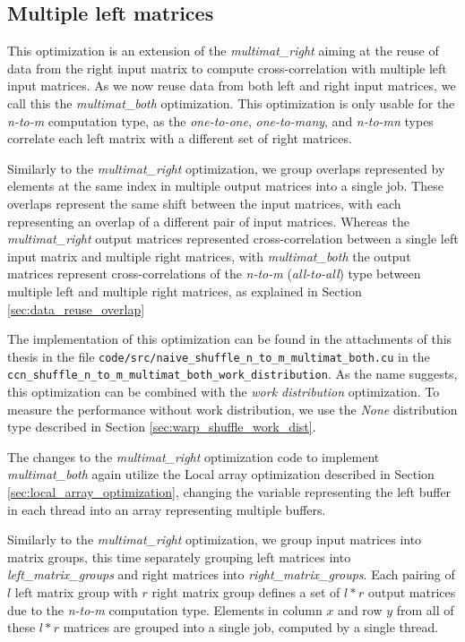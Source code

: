 
\subsection{Multiple left matrices}
\label{sec:multimat_both}

This optimization is an extension of the \textit{multimat\_right} aiming at the reuse of data from the right input matrix to compute cross-correlation with multiple left input matrices. As we now reuse data from both left and right input matrices, we call this the \textit{multimat\_both} optimization. This optimization is only usable for the \textit{n-to-m} computation type, as the \textit{one-to-one}, \textit{one-to-many}, and \textit{n-to-mn} types correlate each left matrix with a different set of right matrices.

Similarly to the \textit{multimat\_right} optimization, we group overlaps represented by elements at the same index in multiple output matrices into a single job. These overlaps represent the same shift between the input matrices, with each representing an overlap of a different pair of input matrices. Whereas the \textit{multimat\_right} output matrices represented cross-correlation between a single left input matrix and multiple right matrices, with \textit{multimat\_both} the output matrices represent cross-correlations of the \textit{n-to-m} (\textit{all-to-all}) type between multiple left and multiple right matrices, as explained in Section \ref{sec:data_reuse_overlap}

The implementation of this optimization can be found in the attachments of this thesis in the file \texttt{code/src/naive\_shuffle\_n\_to\_m\_multimat\_both.cu} in the \texttt{ccn\_shuffle\_n\_to\_m\_multimat\_both\_work\_distribution}. As the name suggests, this optimization can be combined with the \textit{work distribution} optimization. To measure the performance without work distribution, we use the \textit{None} distribution type described in Section \ref{sec:warp_shuffle_work_dist}.


The changes to the \textit{multimat\_right} optimization code to implement \textit{multimat\_both} again utilize the Local array optimization described in Section \ref{sec:local_array_optimization}, changing the variable representing the left buffer in each thread into an array representing multiple buffers. 


Similarly to the \textit{multimat\_right} optimization, we group input matrices into matrix groups, this time separately grouping left matrices into \textit{left\_matrix\_groups} and right matrices into \textit{right\_matrix\_groups}. Each pairing of $l$ left matrix group with $r$ right matrix group defines a set of $l*r$ output matrices due to the \textit{n-to-m} computation type. Elements in column $x$ and row $y$ from all of these $l*r$ matrices are grouped into a single job, computed by a single thread. 

